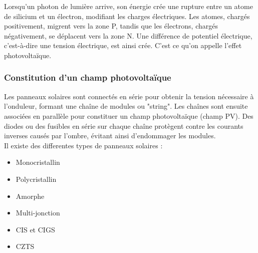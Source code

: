 Lorsqu'un photon de lumière arrive, son énergie crée une rupture entre un atome de silicium et un électron, modifiant les charges électriques. Les atomes, chargés positivement, migrent vers la zone P, tandis que les électrons, chargés négativement, se déplacent vers la zone N. Une différence de potentiel électrique, c'est-à-dire une tension électrique, est ainsi crée. C'est ce qu'on appelle l'effet photovoltaïque.






\subsubsection{Constitution d’un champ photovoltaïque}
Les panneaux solaires sont connectés en série pour obtenir la tension nécessaire à l'onduleur, formant une chaîne de modules ou "string". Les chaînes sont ensuite associées en parallèle pour constituer un champ photovoltaïque (champ PV). Des diodes ou des fusibles en série sur chaque chaîne protègent contre les courants inverses causés par l'ombre, évitant ainsi d'endommager les modules.\\

Il existe des differentes types de panneaux solaires :
\begin{itemize}
	\item Monocristallin
	\item Polycristallin
	\item Amorphe
	\item Multi-jonction
	\item CIS et CIGS
	\item CZTS
\end{itemize}

